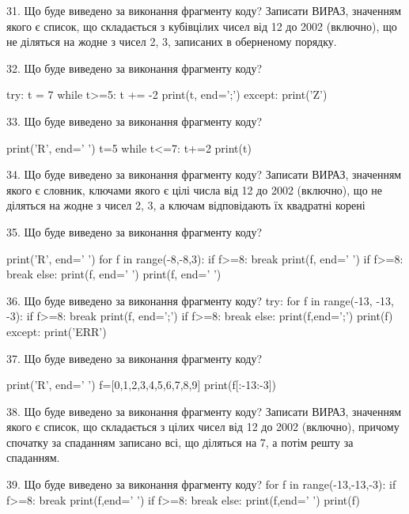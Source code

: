 \documentclass[11pt]{article}
\begin{document}
31. Що буде виведено за виконання фрагменту коду?
Записати ВИРАЗ, значенням якого є список, що складається з кубівцілих чисел від 12 до 2002 (включно), що не діляться на жодне з чисел 2, 3, записаних в обернено\-му порядку.


32. Що буде виведено за виконання фрагменту коду?

try:
    t = 7
    while t>=5:
        t += -2
    print(t, end=';')
except:
    print('Z')



33. Що буде виведено за виконання фрагменту коду?

print('R', end=' ')
t=5
while t<=7:
    t+=2
print(t)



34. Що буде виведено за виконання фрагменту коду?
Записати ВИРАЗ, значенням якого є словник, ключами якого є цілі числа від 12 до 2002 (включно), що не діляться на жодне з чисел 2, 3, а ключам відповідають їх квадратні корені 


35. Що буде виведено за виконання фрагменту коду?

print('R', end=' ')
for f in range(-8,-8,3):
    if f>=8:
        break
        print(f, end=' ')
    if f>=8:
        break
    else:
        print(f, end=' ')
    print(f, end=' ')


36. Що буде виведено за виконання фрагменту коду?
try:
    for f in range(-13, -13, -3):
        if f>=8:
            break
        print(f, end=';')
        if f>=8:
            break
    else:
        print(f,end=';')
    print(f)
except:
    print('ERR')


37. Що буде виведено за виконання фрагменту коду?

print('R', end=' ')
f=[0,1,2,3,4,5,6,7,8,9]
print(f[:-13:-3])



38. Що буде виведено за виконання фрагменту коду?
Записати ВИРАЗ, значенням якого є список, що складається з цілих чисел від 12 до 2002 (включно), причому спочатку за спаданням записано всі, що діляться на 7, а потім решту за спаданням.

39. Що буде виведено за виконання фрагменту коду?
for f in range(-13,-13,-3):
    if f>=8:
        break
        print(f,end=' ')
    if f>=8:
        break
    else:
        print(f,end=' ')
    print(f)
\end{document}
